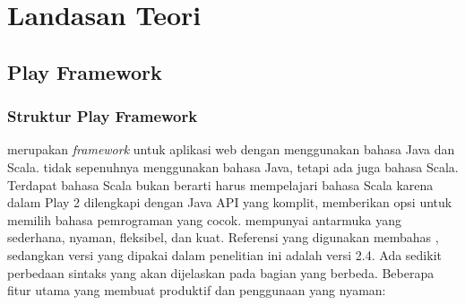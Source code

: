 \chapter{Landasan Teori}
\label{chap:LandasanTeori}

%
%
%
%

\section{Play Framework}
\label{sec:play}
\subsection{Struktur Play Framework}
\play \cite{playforjava} merupakan \textit{framework} untuk aplikasi web dengan menggunakan bahasa Java dan Scala. \play tidak sepenuhnya menggunakan bahasa Java, tetapi ada juga bahasa Scala. Terdapat bahasa Scala bukan berarti harus mempelajari bahasa Scala karena dalam Play 2 dilengkapi dengan Java API yang komplit, memberikan opsi untuk memilih bahasa pemrograman yang cocok. \play mempunyai antarmuka yang sederhana, nyaman, fleksibel, dan kuat. Referensi yang digunakan membahas , sedangkan versi \play yang dipakai dalam penelitian ini adalah versi 2.4. Ada sedikit perbedaan sintaks yang akan dijelaskan pada bagian yang berbeda.
Beberapa fitur utama yang membuat \play produktif dan penggunaan yang nyaman:

